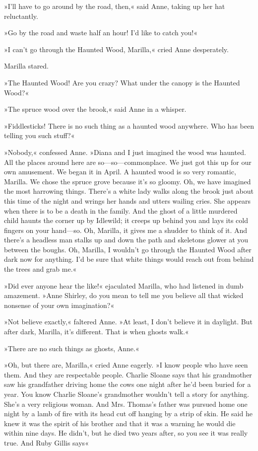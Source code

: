 »I'll have to go around by the road, then,« said Anne, taking up her hat reluctantly.

»Go by the road and waste half an hour! I'd like to catch you!«

»I can't go through the Haunted Wood, Marilla,« cried Anne desperately.

Marilla stared.

»The Haunted Wood! Are you crazy? What under the canopy is the Haunted Wood?«

»The spruce wood over the brook,« said Anne in a whisper.

»Fiddlesticks! There is no such thing as a haunted wood anywhere. Who has been telling you such stuff?«

»Nobody,« confessed Anne. »Diana and I just imagined the wood was haunted. All the places around here are so—so—commonplace. We just got this up for our own amusement. We began it in April. A haunted wood is so very romantic, Marilla. We chose the spruce grove because it's so gloomy. Oh, we have imagined the most harrowing things. There's a white lady walks along the brook just about this time of the night and wrings her hands and utters wailing cries. She appears when there is to be a death in the family. And the ghost of a little murdered child haunts the corner up by Idlewild; it creeps up behind you and lays its cold fingers on your hand—so. Oh, Marilla, it gives me a shudder to think of it. And there's a headless man stalks up and down the path and skeletons glower at you between the boughs. Oh, Marilla, I wouldn't go through the Haunted Wood after dark now for anything. I'd be sure that white things would reach out from behind the trees and grab me.«

»Did ever anyone hear the like!« ejaculated Marilla, who had listened in dumb amazement. »Anne Shirley, do you mean to tell me you believe all that wicked nonsense of your own imagination?«

»Not believe exactly,« faltered Anne. »At least, I don't believe it in daylight. But after dark, Marilla, it's different. That is when ghosts walk.«

»There are no such things as ghosts, Anne.«

»Oh, but there are, Marilla,« cried Anne eagerly. »I know people who have seen them. And they are respectable people. Charlie Sloane says that his grandmother saw his grandfather driving home the cows one night after he'd been buried for a year. You know Charlie Sloane's grandmother wouldn't tell a story for anything. She's a very religious woman. And Mrs. Thomas's father was pursued home one night by a lamb of fire with its head cut off hanging by a strip of skin. He said he knew it was the spirit of his brother and that it was a warning he would die within nine days. He didn't, but he died two years after, so you see it was really true. And Ruby Gillis says\longdash«

